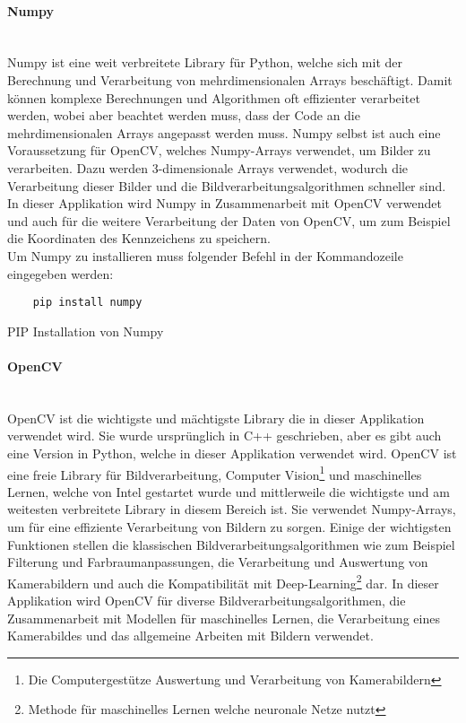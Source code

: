 \paragraph{Numpy}\mbox{}\\
Numpy ist eine weit verbreitete Library für Python, welche sich mit der Berechnung und Verarbeitung von mehrdimensionalen Arrays beschäftigt. 
Damit können komplexe Berechnungen und Algorithmen oft effizienter verarbeitet werden, wobei aber beachtet werden muss, dass der Code an die 
mehrdimensionalen Arrays angepasst werden muss. Numpy selbst ist auch eine Voraussetzung für OpenCV, welches Numpy-Arrays verwendet, um Bilder zu verarbeiten. 
Dazu werden 3-dimensionale Arrays verwendet, wodurch die Verarbeitung dieser Bilder und die Bildverarbeitungsalgorithmen schneller sind. In dieser 
Applikation wird Numpy in Zusammenarbeit mit OpenCV verwendet und auch für die weitere Verarbeitung der Daten von OpenCV, um zum Beispiel die 
Koordinaten des Kennzeichens zu speichern.\\

Um Numpy zu installieren muss folgender Befehl in der Kommandozeile eingegeben werden:

\begin{listing}[H]
    \begin{verbatim}
    pip install numpy
    \end{verbatim}
    \caption{PIP Installation von Numpy}
\end{listing}

\paragraph{OpenCV}\mbox{}\\
OpenCV ist die wichtigste und mächtigste Library die in dieser Applikation verwendet wird. Sie wurde ursprünglich in C++ geschrieben, 
aber es gibt auch eine Version in Python, welche in dieser Applikation verwendet wird. OpenCV ist eine freie Library für Bildverarbeitung, 
Computer Vision\footnote{Die Computergestütze Auswertung und Verarbeitung von Kamerabildern} und maschinelles Lernen, welche von Intel gestartet wurde und mittlerweile die wichtigste und am weitesten verbreitete 
Library in diesem Bereich ist. Sie verwendet Numpy-Arrays, um für eine effiziente Verarbeitung von Bildern zu sorgen. Einige der wichtigsten 
Funktionen stellen die klassischen Bildverarbeitungsalgorithmen wie zum Beispiel Filterung und Farbraumanpassungen, die Verarbeitung und 
Auswertung von Kamerabildern und auch die Kompatibilität mit Deep-Learning\footnote{Methode für maschinelles Lernen welche neuronale Netze nutzt} dar. In dieser Applikation wird OpenCV für diverse 
Bildverarbeitungsalgorithmen, die Zusammenarbeit mit Modellen für maschinelles Lernen, die Verarbeitung eines Kamerabildes und das allgemeine Arbeiten mit Bildern verwendet.\\

